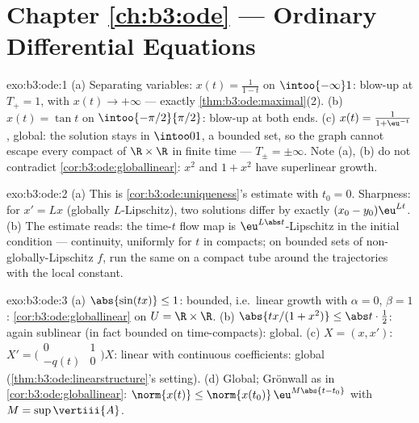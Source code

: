 \section*{Chapter \ref{ch:b3:ode} --- Ordinary Differential
Equations}

\begin{solution}{exo:b3:ode:1}
(a) Separating variables: $x(t) = \frac1{1 - t}$ on
$\intoo{-\infty}1$: blow-up at $T_+ = 1$, with $x(t) \to
+\infty$ --- exactly \cref{thm:b3:ode:maximal}(2).
(b) $x(t) = \tan t$ on $\intoo{-\pi/2}{\pi/2}$: blow-up at
both ends.
(c) $x(t) = \frac{1}{1 + \eu^{-t}}$, global: the solution
stays in $\intoo01$, a bounded set, so the graph cannot
escape every compact of $\R\times\R$ in finite time --- $T_\pm
= \pm\infty$. Note (a), (b) do not contradict
\cref{cor:b3:ode:globallinear}: $x^2$ and $1 + x^2$ have
superlinear growth.
\end{solution}

\begin{solution}{exo:b3:ode:2}
(a) This is \cref{cor:b3:ode:uniqueness}'s estimate with $t_0
= 0$. Sharpness: for $x' = Lx$ (globally $L$-Lipschitz), two
solutions differ by exactly $(x_0 - y_0)\eu^{Lt}$.
(b) The estimate reads: the time-$t$ flow map is
$\eu^{L\abs t}$-Lipschitz in the initial condition ---
continuity, uniformly for $t$ in compacts; on bounded sets of
non-globally-Lipschitz $f$, run the same on a compact tube
around the trajectories with the local constant.
\end{solution}

\begin{solution}{exo:b3:ode:3}
(a) $\abs{\sin(tx)} \leq 1$: bounded, i.e.\ linear growth with
$\alpha = 0$, $\beta = 1$: \cref{cor:b3:ode:globallinear} on
$U = \R\times\R$.
(b) $\abs{tx/(1 + x^2)} \leq \abs t\cdot\frac12$: again
sublinear (in fact bounded on time-compacts): global.
(c) $X = (x, x')$: $X' = \bigl(\begin{smallmatrix}0 & 1\\ -q(t)
& 0\end{smallmatrix}\bigr)X$: linear with continuous
coefficients: global (\cref{thm:b3:ode:linearstructure}'s
setting).
(d) Global; Gr\"onwall as in \cref{cor:b3:ode:globallinear}:
$\norm{x(t)} \leq \norm{x(t_0)}\,\eu^{M\abs{t - t_0}}$ with
$M = \sup\vertiii{A}$.
\end{solution}

